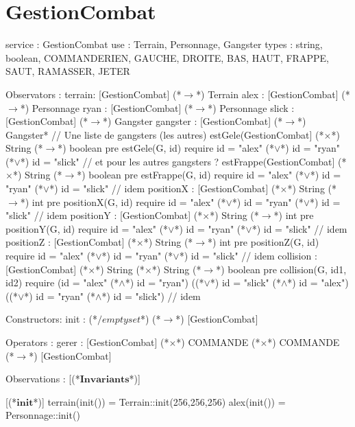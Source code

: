 \documentclass[a4paper, 11pt]{report}
\newcommand{\specB}[1]{\textbf{#1}}
\begin{document}
\section{GestionCombat}
\begin{Spe}
service : GestionCombat
use : Terrain, Personnage, Gangster  
types : string, boolean, COMMANDE{RIEN, GAUCHE, DROITE, BAS, HAUT, FRAPPE, SAUT, RAMASSER, JETER}

Observators :
      terrain: [GestionCombat] (*$\rightarrow$*) Terrain
      alex : [GestionCombat] (*$\rightarrow$*) Personnage
      ryan : [GestionCombat] (*$\rightarrow$*) Personnage
      slick : [GestionCombat] (*$\rightarrow$*) Gangster 
      gangster :  [GestionCombat] (*$\rightarrow$*) {Gangster*} // Une liste de gangsters (les autres) 
      estGele(GestionCombat] (*$\times$*) String (*$\rightarrow$*) boolean 
            pre estGele(G, id) require id = "alex" (*$\lor$*) id = "ryan" (*$\lor$*) id = "slick" // et pour les autres gangsters ?  
      estFrappe(GestionCombat] (*$\times$*) String (*$\rightarrow$*) boolean 
            pre estFrappe(G, id) require id = "alex" (*$\lor$*) id = "ryan" (*$\lor$*) id = "slick" // idem 
      positionX : [GestionCombat] (*$\times$*) String (*$\rightarrow$*) int
            pre positionX(G, id) require id = "alex" (*$\lor$*) id = "ryan" (*$\lor$*) id = "slick" // idem 
      positionY :  [GestionCombat] (*$\times$*) String (*$\rightarrow$*) int 
            pre positionY(G, id) require id = "alex" (*$\lor$*) id = "ryan" (*$\lor$*) id = "slick" // idem 
      positionZ :   [GestionCombat] (*$\times$*) String (*$\rightarrow$*) int
            pre positionZ(G, id) require id = "alex" (*$\lor$*) id = "ryan" (*$\lor$*) id = "slick" // idem  
      collision : [GestionCombat] (*$\times$*) String (*$\times$*) String (*$\rightarrow$*) boolean
            pre collision(G, id1, id2) require (id = "alex" (*$\land$*) id = "ryan")
            ((*$\lor$*) id = "slick" (*$\land$*) id = "alex") 
            ((*$\lor$*) id = "ryan"
            (*$\land$*) id = "slick") // idem 

      Constructors:
      init : (*$/emptyset$*) (*$\rightarrow$*) [GestionCombat]
      
Operators :
      gerer : [GestionCombat] (*$\times$*) COMMANDE (*$\times$*) COMMANDE (*$\rightarrow$*) [GestionCombat]

Observations : 
      [(*$\specB{Invariants}$*)]
            
      [(*$\specB{init}$*)]
            terrain(init()) = Terrain::init(256,256,256)
            alex(init()) = Personnage::init()

\end{Spe}
\end{document}
